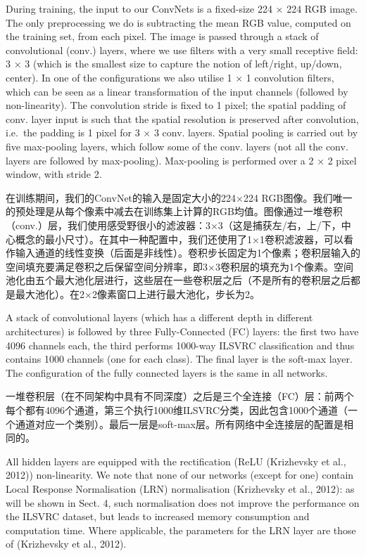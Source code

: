 \documentclass[12pt,a4paper,UTF8,twoside]{book}
\begin{document}
During training, the input to our ConvNets is a fixed-size 224 × 224 RGB image. The only preprocessing we do is subtracting the mean RGB value, computed on the training set, from each pixel. The image is passed through a stack of convolutional (conv.) layers, where we use filters with a very small receptive field: 3 × 3 (which is the smallest size to capture the notion of left/right, up/down, center). In one of the configurations we also utilise 1 × 1 convolution filters, which can be seen as a linear transformation of the input channels (followed by non-linearity). The convolution stride is fixed to 1 pixel; the spatial padding of conv. layer input is such that the spatial resolution is preserved after convolution, i.e.~the padding is 1 pixel for 3 × 3 conv. layers. Spatial pooling is carried out by five max-pooling layers, which follow some of the conv. layers (not all the conv. layers are followed by max-pooling). Max-pooling is performed over a 2 × 2 pixel window, with stride 2.

在训练期间，我们的ConvNet的输入是固定大小的224×224 RGB图像。我们唯一的预处理是从每个像素中减去在训练集上计算的RGB均值。图像通过一堆卷积（conv.）层，我们使用感受野很小的滤波器：3×3（这是捕获左/右，上/下，中心概念的最小尺寸）。在其中一种配置中，我们还使用了1×1卷积滤波器，可以看作输入通道的线性变换（后面是非线性）。卷积步长固定为1个像素；卷积层输入的空间填充要满足卷积之后保留空间分辨率，即3×3卷积层的填充为1个像素。空间池化由五个最大池化层进行，这些层在一些卷积层之后（不是所有的卷积层之后都是最大池化）。在2×2像素窗口上进行最大池化，步长为2。

A stack of convolutional layers (which has a different depth in different architectures) is followed by three Fully-Connected (FC) layers: the first two have 4096 channels each, the third performs 1000-way ILSVRC classification and thus contains 1000 channels (one for each class). The final layer is the soft-max layer. The configuration of the fully connected layers is the same in all networks.

一堆卷积层（在不同架构中具有不同深度）之后是三个全连接（FC）层：前两个每个都有4096个通道，第三个执行1000维ILSVRC分类，因此包含1000个通道（一个通道对应一个类别）。最后一层是soft-max层。所有网络中全连接层的配置是相同的。

All hidden layers are equipped with the rectification (ReLU (Krizhevsky et al., 2012)) non-linearity. We note that none of our networks (except for one) contain Local Response Normalisation (LRN) normalisation (Krizhevsky et al., 2012): as will be shown in Sect. 4, such normalisation does not improve the performance on the ILSVRC dataset, but leads to increased memory consumption and computation time. Where applicable, the parameters for the LRN layer are those of (Krizhevsky et al., 2012).
\end{document}

